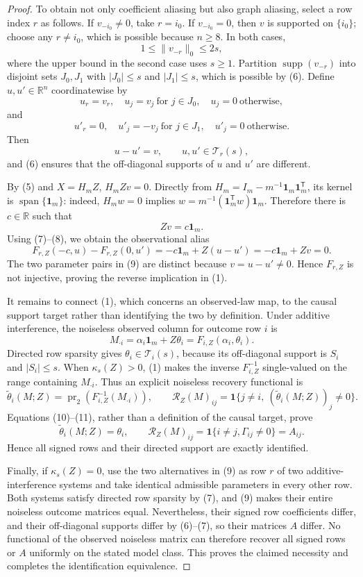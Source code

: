 \documentclass{article}
\begin{document}
\begin{proof}
To obtain not only coefficient aliasing but also graph aliasing, select a row index \(r\) as follows.  If \(v_{-i_0}\ne0\), take \(r=i_0\).  If \(v_{-i_0}=0\), then \(v\) is supported on \(\{i_0\}\); choose any \(r\ne i_0\), which is possible because \(n\ge8\).  In both cases,
\[
1\le\lVert v_{-r}\rVert_0\le2s, \tag{6}
\]
where the upper bound in the second case uses \(s\ge1\).  Partition \(\operatorname{supp}(v_{-r})\) into disjoint sets \(J_0,J_1\) with \(\lvert J_0\rvert\le s\) and \(\lvert J_1\rvert\le s\), which is possible by (6).  Define \(u,u'\in\mathbb R^n\) coordinatewise by
\[
u_r=v_r,
\quad u_j=v_j\ \text{for }j\in J_0,
\quad u_j=0\ \text{otherwise},
\]
and
\[
u'_r=0,
\quad u'_j=-v_j\ \text{for }j\in J_1,
\quad u'_j=0\ \text{otherwise}.
\]
Then
\[
u-u'=v,
\qquad u,u'\in\mathcal T_r(s), \tag{7}
\]
and (6) ensures that the off-diagonal supports of \(u\) and \(u'\) are different.

By (5) and \(X=H_mZ\), \(H_mZv=0\).  Directly from
\(H_m=I_m-m^{-1}\mathbf 1_m\mathbf 1_m^{\mathsf T}\), its kernel is
\(\operatorname{span}\{\mathbf 1_m\}\): indeed, \(H_mw=0\) implies
\(w=m^{-1}(\mathbf 1_m^{\mathsf T}w)\mathbf 1_m\).  Therefore there is \(c\in\mathbb R\) such that
\[
Zv=c\mathbf 1_m. \tag{8}
\]
Using (7)--(8), we obtain the observational alias
\[
F_{r,Z}(-c,u)-F_{r,Z}(0,u')
=-c\mathbf 1_m+Z(u-u')
=-c\mathbf 1_m+Zv
=0. \tag{9}
\]
The two parameter pairs in (9) are distinct because \(v=u-u'\ne0\).  Hence \(F_{r,Z}\) is not injective, proving the reverse implication in (1).

It remains to connect (1), which concerns an observed-law map, to the causal support target rather than identifying the two by definition.  Under additive interference, the noiseless observed column for outcome row \(i\) is
\[
M_{\cdot i}=\alpha_i\mathbf 1_m+Z\theta_i=F_{i,Z}(\alpha_i,\theta_i). \tag{10}
\]
Directed row sparsity gives \(\theta_i\in\mathcal T_i(s)\), because its off-diagonal support is \(S_i\) and \(\lvert S_i\rvert\le s\).  When \(\kappa_s(Z)>0\), (1) makes the inverse \(F_{i,Z}^{-1}\) single-valued on the range containing \(M_{\cdot i}\).  Thus an explicit noiseless recovery functional is
\[
\widetilde\theta_i(M;Z)
=\operatorname{pr}_2\!\left(F_{i,Z}^{-1}(M_{\cdot i})\right),
\qquad
\mathcal R_Z(M)_{ij}
=\mathbf 1\{j\ne i,\ (\widetilde\theta_i(M;Z))_j\ne0\}. \tag{11}
\]
Equations (10)--(11), rather than a definition of the causal target, prove
\[
\widetilde\theta_i(M;Z)=\theta_i,
\qquad
\mathcal R_Z(M)_{ij}
=\mathbf 1\{i\ne j,\Gamma_{ij}\ne0\}=A_{ij}. \tag{12}
\]
Hence all signed rows and their directed support are exactly identified.

Finally, if \(\kappa_s(Z)=0\), use the two alternatives in (9) as row \(r\) of two additive-interference systems and take identical admissible parameters in every other row.  Both systems satisfy directed row sparsity by (7), and (9) makes their entire noiseless outcome matrices equal.  Nevertheless, their signed row coefficients differ, and their off-diagonal supports differ by (6)--(7), so their matrices \(A\) differ.  No functional of the observed noiseless matrix can therefore recover all signed rows or \(A\) uniformly on the stated model class.  This proves the claimed necessity and completes the identification equivalence.
\end{proof}
\end{document}
